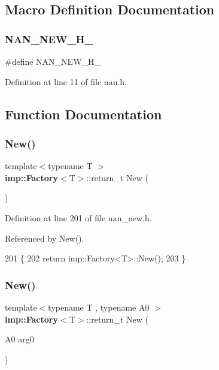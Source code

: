 \subsection{Macro Definition Documentation}
\mbox{\label{nan_8h_a2e90a8b94f439ce4fdbc924b09f104c7}} 
\subsubsection{N\+A\+N\+\_\+\+N\+E\+W\+\_\+\+H\+\_\+}
{\footnotesize\ttfamily \#define N\+A\+N\+\_\+\+N\+E\+W\+\_\+\+H\+\_\+}



Definition at line 11 of file nan.\+h.



\subsection{Function Documentation}
\mbox{\label{nan__new_8h_ae28eb9e32bc1b22cc3d0d48c1e7f1049}} 
\subsubsection{New()\hspace{0.1cm}{\footnotesize\ttfamily [1/22]}}
{\footnotesize\ttfamily template$<$typename T $>$ \\
\textbf{ imp\+::\+Factory}$<$T$>$\+::return\+\_\+t New (\begin{DoxyParamCaption}{ }\end{DoxyParamCaption})}



Definition at line 201 of file nan\+\_\+new.\+h.



Referenced by New().


\begin{DoxyCode}
201       \{
202   \textcolor{keywordflow}{return} imp::Factory<T>::New();
203 \}
\end{DoxyCode}
\mbox{\label{nan__new_8h_a8eded246756db7dc5741735bfaaa5310}} 
\subsubsection{New()\hspace{0.1cm}{\footnotesize\ttfamily [2/22]}}
{\footnotesize\ttfamily template$<$typename T , typename A0 $>$ \\
\textbf{ imp\+::\+Factory}$<$T$>$\+::return\+\_\+t New (\begin{DoxyParamCaption}\item[{A0}]{arg0 }\end{DoxyParamCaption})}



